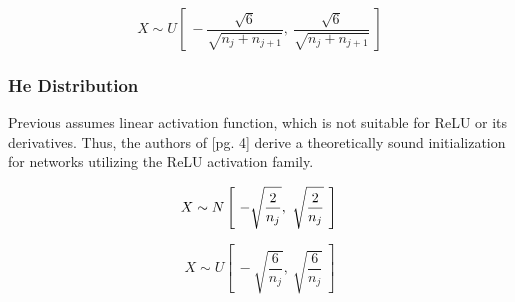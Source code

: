 \documentclass[12pt]{article}
\begin{document}
\begin{equation}
    X \sim U \left[~-\frac{\sqrt{6}}{\sqrt{n_{j} + n_{j+1}}},~\frac{\sqrt{6}}{\sqrt{n_{j} + n_{j+1}}}~\right]
    \label{eq:glorot:uniform}
\end{equation}

\subsubsection{He Distribution}

Previous assumes linear activation function, which is not suitable for ReLU or its derivatives. Thus, the authors of \cite{he15}[pg. 4] derive a theoretically sound initialization for networks utilizing the ReLU activation family.

\begin{equation}
    X \sim N \left[~-\sqrt{\frac{2}{n_{j}}},~\sqrt{\frac{2}{n_{j}}}~\right]\\
    \label{eq:he:normal}
\end{equation}

\begin{equation}
    X \sim U \left[~-\sqrt{\frac{6}{n_{j}}},~\sqrt{\frac{6}{n_{j}}}~\right]
    \label{eq:he:uniform}
\end{equation}



\end{document}
